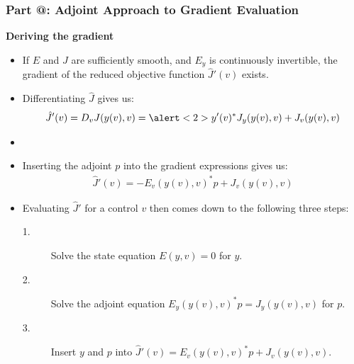 \documentclass[9pt]{beamer}
\makeatletter
\newcommand*{\rom}[1]{\expandafter\@slowromancap\romannumeral #1@}
\makeatother
\begin{document}
\begin{frame}
\frametitle{\textbf{ Part \rom{1}:} Adjoint Approach to Gradient Evaluation}
\textbf{Deriving the gradient}
\begin{itemize}
\item<1->{If $E$ and $J$ are sufficiently smooth, and $E_y$ is continuously invertible, the gradient of the reduced objective function $\hat J'(v)$ exists.}
\item<1->{Differentiating $\hat J$ gives us: 
\begin{align*}
\hat J'(v)=D_vJ(y(v),v)=\alert<2>{y'(v)^*}J_y(y(v),v)+J_v(y(v),v)
\end{align*}}
\item<3->{ 
}
\item<7->{Inserting the adjoint $p$ into the gradient expressions gives us:}
\begin{align*}
\hat J'(v) = -E_v(y(v),v)^*p+J_v(y(v),v)
\end{align*}
\item<8->{Evaluating $\hat J'$ for a control $v$ then comes down to the following three steps:
\begin{description}
\item[1.]{Solve the state equation $E(y,v)=0$ for $y$.}
\item[2.]{Solve the adjoint equation $E_y(y(v),v)^*p = J_y(y(v),v)$ for $p$.}
\item[3.]{Insert $y$ and $p$ into $\hat J'(v)=E_v(y(v),v)^*p +J_v(y(v),v)$.}
\end{description}}
\end{itemize}
\end{frame}
\end{document}
